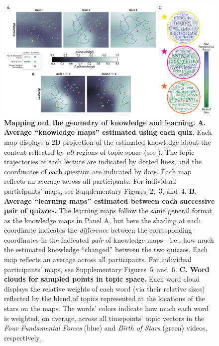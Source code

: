 \documentclass[10pt]{article}
\newcommand{\individualKnowledgeMapsA}{2}
\newcommand{\individualKnowledgeMapsB}{3}
\newcommand{\individualKnowledgeMapsC}{4}
\newcommand{\individualLearningMapsA}{5}
\newcommand{\individualLearningMapsB}{6}
\renewcommand{\nameref}[1]{\mbox{\textit{\oldnameref{#1}}}}
\begin{document}
\begin{figure}[tp]
    \centering
    \includegraphics[width=\textwidth]{figs/knowledge_and_learning_maps}

    \caption{\textbf{Mapping out the geometry of knowledge and learning.}
    \textbf{A. Average ``knowledge maps'' estimated using each quiz.} Each map
    displays a 2D projection of the estimated knowledge about the content
    reflected by \textit{all} regions of topic space (see
    \nameref{subsec:knowledge-maps}). The topic trajectories of each
    lecture are indicated by dotted lines, and the coordinates of each question are indicated by
    dots. Each map reflects an average across all participants. For
    individual participants' maps, see
    Supplementary Figures~\individualKnowledgeMapsA,~\individualKnowledgeMapsB,
    and~\individualKnowledgeMapsC. \textbf{B. Average ``learning maps''
    estimated between each successive pair of quizzes.} The learning maps follow
    the same general format as the knowledge maps in Panel A, but here the shading at each
    coordinate indicates the \textit{difference} between
    the corresponding coordinates in the indicated \textit{pair} of knowledge
    maps---i.e., how much the estimated knowledge ``changed'' between the two
    quizzes. Each map reflects an average across all participants. For
    individual participants' maps, see Supplementary
    Figures~\individualLearningMapsA~and~\individualLearningMapsB. \textbf{C.
    Word clouds for sampled points in topic space.} Each word cloud displays
    the relative weights of each word (via their relative sizes) reflected by the blend of topics
    represented at the locations of the stars on the maps. The words' colors
    indicate how much each word is weighted, on average, across all timepoints'
    topic vectors in the \textit{Four Fundamental Forces} (blue) and
    \textit{Birth of Stars} (green) videos, respectively.}

    \label{fig:knowledge-maps}
    \end{figure}
\end{document}
